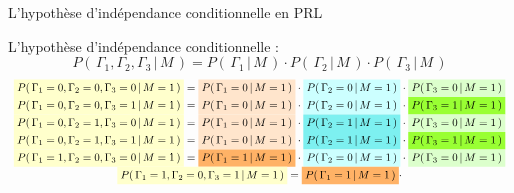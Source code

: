 \begin{frame}{\vskip -0.3cm \large L'hypoth\`ese d'ind\'ependance conditionnelle en PRL}
\pause

\scriptsize
L'hypoth\`ese d'ind\'ependance conditionnelle :
\vskip -0.25cm
\begin{equation*}
P\!\left(\,\Gamma_{1},\Gamma_{2},\Gamma_{3}\,\vert\,M\,\right)
= P\!\left(\,\Gamma_{1}\,\vert\,M\,\right) \cdot P\!\left(\,\Gamma_{2}\,\vert\,M\,\right) \cdot P\!\left(\,\Gamma_{3}\,\vert\,M\,\right)
\end{equation*}
\pause
\vskip -0.75cm
{\tiny
\begin{equation*}
\begin{array}{c}
\colorbox{lightYellow}{$P\!\left(\,\Gamma_{1}=0,\Gamma_{2}=0,\Gamma_{3}=0\,\vert\,M=1\,\right)$}=
	\colorbox{lightOrange}{$P\!\left(\,\Gamma_{1}=0\,\vert\,M=1\,\right)$} \cdot
	\colorbox{lightCyan}{$P\!\left(\,\Gamma_{2}=0\,\vert\,M=1\,\right)$} \cdot
	\colorbox{lightGreen}{$P\!\left(\,\Gamma_{3}=0\,\vert\,M=1\,\right)$}
\\
\colorbox{lightYellow}{$P\!\left(\,\Gamma_{1}=0,\Gamma_{2}=0,\Gamma_{3}=1\,\vert\,M=1\,\right)$}=
	\colorbox{lightOrange}{$P\!\left(\,\Gamma_{1}=0\,\vert\,M=1\,\right)$} \cdot
	\colorbox{lightCyan}{$P\!\left(\,\Gamma_{2}=0\,\vert\,M=1\,\right)$} \cdot
	\colorbox{mediumGreen}{$P\!\left(\,\Gamma_{3}=1\,\vert\,M=1\,\right)$}
\\
\colorbox{lightYellow}{$P\!\left(\,\Gamma_{1}=0,\Gamma_{2}=1,\Gamma_{3}=0\,\vert\,M=1\,\right)$}=
	\colorbox{lightOrange}{$P\!\left(\,\Gamma_{1}=0\,\vert\,M=1\,\right)$} \cdot
	\colorbox{mediumCyan}{$P\!\left(\,\Gamma_{2}=1\,\vert\,M=1\,\right)$} \cdot
	\colorbox{lightGreen}{$P\!\left(\,\Gamma_{3}=0\,\vert\,M=1\,\right)$}
\\
\colorbox{lightYellow}{$P\!\left(\,\Gamma_{1}=0,\Gamma_{2}=1,\Gamma_{3}=1\,\vert\,M=1\,\right)$}=
	\colorbox{lightOrange}{$P\!\left(\,\Gamma_{1}=0\,\vert\,M=1\,\right)$} \cdot
	\colorbox{mediumCyan}{$P\!\left(\,\Gamma_{2}=1\,\vert\,M=1\,\right)$} \cdot
	\colorbox{mediumGreen}{$P\!\left(\,\Gamma_{3}=1\,\vert\,M=1\,\right)$}
\\
\colorbox{lightYellow}{$P\!\left(\,\Gamma_{1}=1,\Gamma_{2}=0,\Gamma_{3}=0\,\vert\,M=1\,\right)$}=
	\colorbox{mediumOrange}{$P\!\left(\,\Gamma_{1}=1\,\vert\,M=1\,\right)$} \cdot
	\colorbox{lightCyan}{$P\!\left(\,\Gamma_{2}=0\,\vert\,M=1\,\right)$} \cdot
	\colorbox{lightGreen}{$P\!\left(\,\Gamma_{3}=0\,\vert\,M=1\,\right)$}
\\
\colorbox{lightYellow}{$P\!\left(\,\Gamma_{1}=1,\Gamma_{2}=0,\Gamma_{3}=1\,\vert\,M=1\,\right)$}=
	\colorbox{mediumOrange}{$P\!\left(\,\Gamma_{1}=1\,\vert\,M=1\,\right)$} \cdot

\end{array}
\end{equation*}}
\end{frame}
